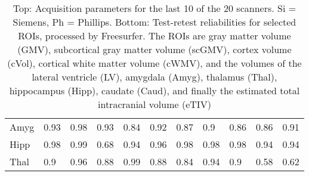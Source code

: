 \begin{table}
\begin{tabular}{lllllllllll}
Amyg                      &   0.93 &   0.98 &   0.93 &   0.84 &   0.92 &   0.87 &    0.9 &   0.86 &   0.86 &   0.91 \\
Hipp                   &   0.98 &   0.99 &   0.68 &   0.94 &   0.96 &   0.98 &   0.98 &   0.98 &   0.94 &   0.94 \\
Thal               &    0.9 &   0.96 &   0.88 &   0.99 &   0.88 &   0.84 &   0.94 &    0.9 &   0.58 &   0.62 \\
\bottomrule
\end{tabular}
\caption{Top: Acquisition parameters for the last 10 of the 20 scanners. Si = Siemens, Ph = Phillips. Bottom: Test-retest reliabilities for selected ROIs, processed by Freesurfer. The ROIs are gray matter volume (GMV), subcortical gray matter volume (scGMV), cortex volume (cVol), cortical white matter volume (cWMV), and the volumes of the lateral ventricle (LV), amygdala (Amyg), thalamus (Thal), hippocampus (Hipp), caudate (Caud), and finally the estimated total intracranial volume (eTIV)} 
\label{tab:acquisition2}

\end{table}